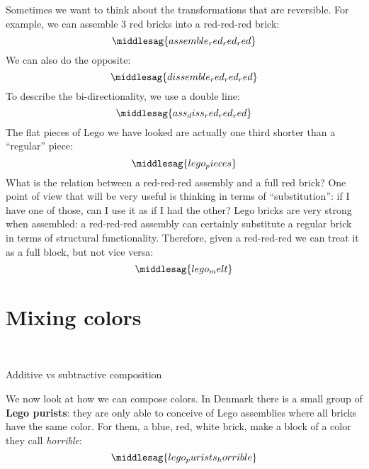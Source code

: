 Sometimes we want to think about the transformations that are reversible.
For example, we can assemble 3 red bricks into a red-red-red brick:
%
\begin{equation}
    \middlesag{assemble_red_red_red}
\end{equation}
%
We can also do the opposite:
%
\begin{equation}
    \middlesag{dissemble_red_red_red}
\end{equation}
%
To describe the bi-directionality, we use a double line:
%
\begin{equation}
    \middlesag{ass_diss_red_red_red}
\end{equation}
%
The flat pieces of Lego we have looked are actually one third shorter than a ``regular'' piece:
%
\begin{equation}
    \middlesag{lego_pieces}
\end{equation}
%
What is the relation between a red-red-red assembly and a full red brick?
One point of view that will be very useful is thinking in terms of ``substitution'': if I have one of those, can I use it as if I had the other?
Lego bricks are very strong when assembled: a red-red-red assembly can certainly substitute a regular brick in terms of structural functionality.
Therefore, given a red-red-red we can treat it as a full block, but not vice versa:
%
\begin{equation}
    \middlesag{lego_melt}
\end{equation}

\section{Mixing colors}

\begin{marginfigure}
    \centering
    \\
    \caption{Additive vs subtractive composition}
\end{marginfigure}

We now look at how we can compose colors.
In Denmark there is a small group of \textbf{Lego purists}: they are only able to conceive of Lego assemblies where all bricks have the same color.
For them, a blue, red, white brick, make a block of a color they call \emph{horrible}:
%
\begin{equation}
    \middlesag{lego_purists_horrible}
\end{equation}

